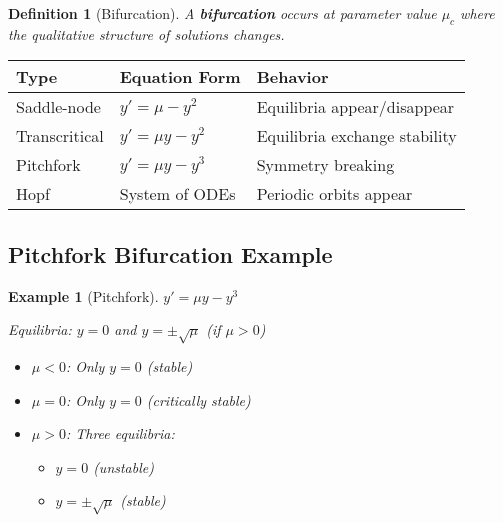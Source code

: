 \documentclass[12pt]{article}
\newtheorem{definition}{Definition}
\newtheorem{example}{Example}
\begin{document}
\begin{definition}[Bifurcation]
A \textbf{bifurcation} occurs at parameter value $\mu_c$ where the qualitative structure of solutions changes.
\end{definition}

\begin{table}[h]
\centering
\begin{tabular}{|l|l|l|}
\hline
\textbf{Type} & \textbf{Equation Form} & \textbf{Behavior} \\
\hline
Saddle-node & $y' = \mu - y^2$ & Equilibria appear/disappear \\
Transcritical & $y' = \mu y - y^2$ & Equilibria exchange stability \\
Pitchfork & $y' = \mu y - y^3$ & Symmetry breaking \\
Hopf & System of ODEs & Periodic orbits appear \\
\hline
\end{tabular}
\end{table}

\subsection{Pitchfork Bifurcation Example}

\begin{example}[Pitchfork]
$y' = \mu y - y^3$

Equilibria: $y = 0$ and $y = \pm\sqrt{\mu}$ (if $\mu > 0$)

\begin{itemize}
    \item $\mu < 0$: Only $y = 0$ (stable)
    \item $\mu = 0$: Only $y = 0$ (critically stable)
    \item $\mu > 0$: Three equilibria:
    \begin{itemize}
        \item $y = 0$ (unstable)
        \item $y = \pm\sqrt{\mu}$ (stable)
    \end{itemize}
\end{itemize}
\end{example}

\begin{center}
\end{center}
\end{document}
